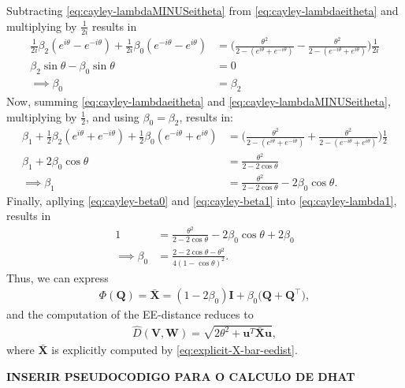 Subtracting \eqref{eq:cayley-lambdaMINUSeitheta} from \eqref{eq:cayley-lambdaeitheta} and multiplying by $\frac{1}{2i}$ results in
\begin{align}
    \frac{1}{2i}\beta_2(e^{i\theta}-e^{-i\theta}) +\frac{1}{2i}\beta_0(e^{-i\theta}-e^{i\theta}) &= \biggl(\frac{\theta^2}{2 - (e^{i\theta}+ e^{-i\theta})} - \frac{\theta^2}{2 - (e^{-i\theta}+ e^{i\theta})}\biggr)\frac{1}{2i}\\
    \beta_2\sin\theta -\beta_0\sin\theta &= 0\\
    \implies \beta_0&=\beta_2 \label{eq:cayley-beta0}
\end{align}
Now, summing \eqref{eq:cayley-lambdaeitheta} and \eqref{eq:cayley-lambdaMINUSeitheta}, multiplying by $\frac{1}{2}$, and using $\beta_0=\beta_2$, results in:
\begin{align}
    \beta_1+\frac{1}{2}\beta_2(e^{i\theta}+e^{-i\theta}) +\frac{1}{2}\beta_0(e^{-i\theta}+e^{i\theta}) &= \biggl(\frac{\theta^2}{2 - (e^{i\theta}+ e^{-i\theta})} + \frac{\theta^2}{2 - (e^{-i\theta}+ e^{i\theta})}\biggr)\frac{1}{2}\\
    \beta_1+2\beta_0\cos\theta  &= \frac{\theta^2}{2 - 2\cos\theta}\\
    \implies \beta_1&=\frac{\theta^2}{2 - 2\cos\theta} - 2\beta_0\cos\theta. \label{eq:cayley-beta1}
\end{align}
Finally, apllying \eqref{eq:cayley-beta0} and \eqref{eq:cayley-beta1} into \eqref{eq:cayley-lambda1}, results in
\begin{align}
    1 &= \frac{\theta^2}{2 - 2\cos\theta} - 2\beta_0\cos\theta + 2\beta_0 \\
    \implies \beta_0 &= \frac{2-2\cos\theta-\theta^2}{4(1 - \cos\theta)^2}. 
\end{align}
Thus, we can express
\begin{align}
    \Phi(\mathbf{Q}) = \bar{\mathbf{X}} = (1-2\beta_0)\mathbf{I} + \beta_0\bigl(\mathbf{Q} + \mathbf{Q}^\top\bigr), \label{eq:explicit-X-bar-eedist}
\end{align}
and the computation of the EE-distance reduces to
\begin{align}
    \widehat{D}(\mathbf{V}, \mathbf{W}) = \sqrt{2\theta^2 + \mathbf{u}^T\bar{\mathbf{X}}\mathbf{u}},
\end{align}
where $\bar{\mathbf{X}}$ is explicitly computed by \eqref{eq:explicit-X-bar-eedist}.

\textbf{INSERIR PSEUDOCODIGO PARA O CALCULO DE DHAT}




